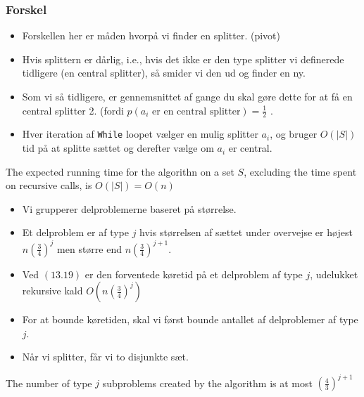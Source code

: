 \documentclass{beamer}
\begin{document}
\begin{frame}[allowframebreaks]
  \frametitle{Forskel}

  \begin{itemize}
  \item Forskellen her er måden hvorpå vi finder en splitter. (pivot)
  \item Hvis splittern er dårlig, i.e., hvis det ikke er den type splitter vi definerede tidligere (en central splitter), så smider vi den ud og finder en ny.
  \item Som vi så tidligere, er gennemsnittet af gange du skal gøre dette for at få en central splitter 2. (fordi $p(a_{i} \text{ er en central splitter}) = \frac{1}{2}$ .
  \item Hver iteration af \texttt{While} loopet vælger en mulig splitter $a_{i}$, og bruger $O(|S|)$ tid på at splitte sættet og derefter vælge om $a_{i}$ er central.
  \end{itemize}
  \begin{theorem}[13.19]
The expected running time for the algorithn on a set $S$, excluding the time spent on recursive calls, is $O(|S|) = O(n)$
\end{theorem}
\begin{itemize}
\item Vi grupperer delproblemerne baseret på størrelse. 
\item Et delproblem er af type $j$ hvis størrelsen af sættet under overvejse er højest $n \left( \frac{3}{4} \right)^{j}$ men større end $n \left( \frac{3}{4} \right)^{j+1}$.
\item Ved $(13.19)$ er den forventede køretid på et delproblem af type $j$, udelukket rekursive kald $O(n \left( \frac{3}{4} \right)^{j})$
\item For at bounde køretiden, skal vi først bounde antallet af delproblemer af type $j$. 
\item Når vi splitter, får vi to disjunkte sæt. 
\end{itemize}

\begin{theorem}[13.20]
The number of type $j$ subproblems created by the algorithm is at most $\left( \frac{4}{3} \right)^{j+1}$
\end{theorem}


\end{frame}
\end{document}
